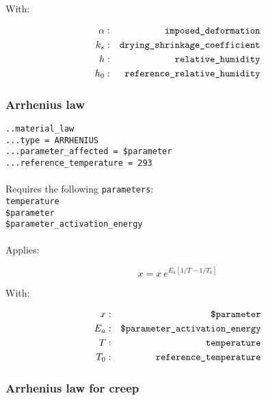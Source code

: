 \documentclass[10pt]{article}
\begin{document}
With:

\begin{eqnarray}
	\alpha & : & \verb+imposed_deformation+ \notag \\
	k_s & : & \verb+drying_shrinkage_coefficient+\notag  \\
	h & : & \verb+relative_humidity+ \notag \\
	h_0 & : & \verb+reference_relative_humidity+ \notag 
\end{eqnarray}

\subsubsection{Arrhenius law}

\noindent \verb+..material_law+\\
\verb+...type = ARRHENIUS+\\
\verb+...parameter_affected = $parameter+\\
\verb+...reference_temperature = 293+

\paragraph{}Requires the following \verb+parameters+:\\

\noindent \verb+temperature+\\
\verb+$parameter+\\
\verb+$parameter_activation_energy+

\paragraph{}Applies:

\begin{equation}
	x = x\ e^{E_a \left[ 1/T - 1/T_0 \right]}
\end{equation}

With:

\begin{eqnarray}
	x & : & \verb+$parameter+ \notag \\
	E_a & : & \verb+$parameter_activation_energy+\notag  \\
	T & : & \verb+temperature+ \notag \\
	T_0 & : & \verb+reference_temperature+ \notag 
\end{eqnarray}

\subsubsection{Arrhenius law for creep}
\end{document}
